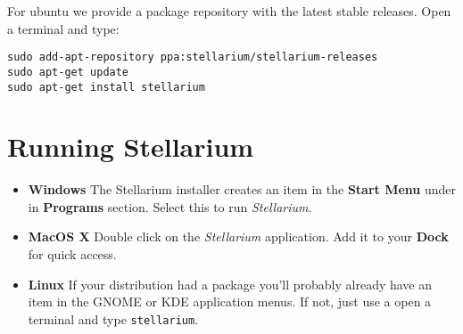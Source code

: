 For ubuntu we provide a package repository with the latest stable
releases. Open a terminal and type:

\texttt{sudo~add-apt-repository~ppa:stellarium/stellarium-releases}\\
\texttt{sudo~apt-get~update}\\
\texttt{sudo~apt-get~install~stellarium}

\section{Running Stellarium}

\begin{itemize}
\item
  \textbf{Windows} The Stellarium installer creates an item in the
  \textbf{Start Menu} under in \textbf{Programs} section. Select this to
  run \emph{Stellarium}.
\item
  \textbf{MacOS X} Double click on the \emph{Stellarium} application.
  Add it to your \textbf{Dock} for quick access.
\item
  \textbf{Linux} If your distribution had a package you'll probably
  already have an item in the GNOME or KDE application menus. If not,
  just use a open a terminal and type \texttt{stellarium}.
\end{itemize}
